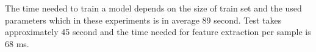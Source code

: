 The time needed to train a model depends on the size of train set and the used parameters which in these experiments is in average
89 second.
Test takes approximately 45 second and the time needed for feature extraction per sample is 68 ms.


% 
% 
% 
% 
% 
% 
% 
% 
